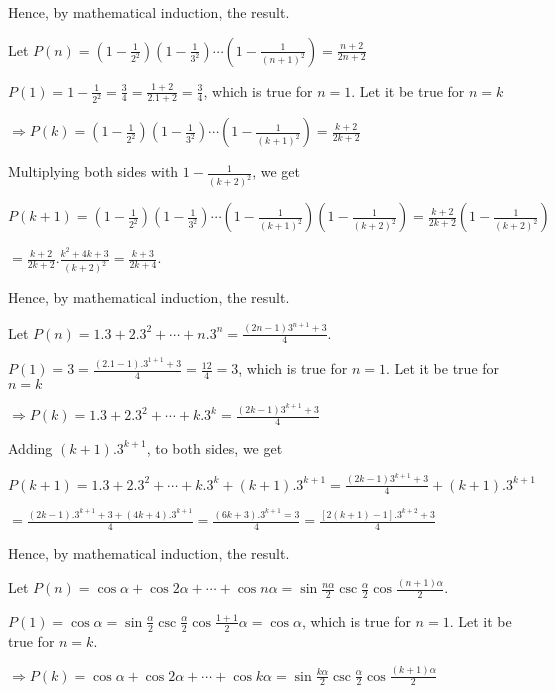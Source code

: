   Hence, by mathematical induction, the result.
\item Let $P(n) = \left(1 - \frac{1}{2^2}\right)\left(1 - \frac{1}{3^2}\right)\cdots\left(1 - \frac{1}{(n +
  1)^2}\right) = \frac{n + 2}{2n + 2}$

  $P(1) = 1 - \frac{1}{2^2} = \frac{3}{4} = \frac{1 + 2}{2.1 + 2} = \frac{3}{4}$, which is true for $n =
  1$. Let it be true for $n = k$

  $\Rightarrow P(k) = \left(1 - \frac{1}{2^2}\right)\left(1 - \frac{1}{3^2}\right)\cdots\left(1 - \frac{1}{(k +
    1)^2}\right) = \frac{k + 2}{2k + 2}$

  Multiplying both sides with $1 - \frac{1}{(k + 2)^2}$, we get

  $P(k + 1) = \left(1 - \frac{1}{2^2}\right)\left(1 - \frac{1}{3^2}\right)\cdots\left(1 - \frac{1}{(k +
    1)^2}\right)\left(1 - \frac{1}{(k + 2)^2}\right) = \frac{k + 2}{2k + 2}\left(1 - \frac{1}{(k +
    2)^2}\right)$

  $= \frac{k + 2}{2k + 2}.\frac{k^2 + 4k + 3}{(k + 2)^2} = \frac{k + 3}{2k + 4}$.

  Hence, by mathematical induction, the result.
\item Let $P(n) = 1.3 + 2.3^2 + \cdots + n.3^n = \frac{(2n - 1)3^{n + 1} + 3}{4}$.

  $P(1) = 3 = \frac{(2.1 - 1).3^{1 + 1} + 3}{4} = \frac{12}{4} = 3$, which is true for $n = 1$. Let it be
  true for $n = k$

  $\Rightarrow P(k) = 1.3 + 2.3^2 + \cdots + k.3^k = \frac{(2k - 1)3^{k + 1} + 3}{4}$

  Adding $(k + 1).3^{k + 1}$, to both sides, we get

  $P(k + 1) = 1.3 + 2.3^2 + \cdots + k.3^k + (k + 1).3^{k + 1} = \frac{(2k - 1)3^{k + 1} + 3}{4} + (k +
  1).3^{k + 1}$

  $= \frac{(2k - 1).3^{k + 1} + 3 + (4k + 4).3^{k + 1}}{4} = \frac{(6k + 3).3^{k + 1} = 3}{4} = \frac{[2(k +
      1) - 1].3^{k + 2} + 3}{4}$

  Hence, by mathematical induction, the result.
\item Let $P(n) = \cos\alpha + \cos2\alpha + \cdots + \cos n\alpha =
  \sin\frac{n\alpha}{2}\csc\frac{\alpha}{2}\cos\frac{(n + 1)\alpha}{2}$.

  $P(1) = \cos\alpha = \sin\frac{\alpha}{2}\csc\frac{\alpha}{2}\cos\frac{1 + 1}{2}\alpha = \cos\alpha$,
  which is true for $n = 1$. Let it be true for $n = k$.

  $\Rightarrow P(k) = \cos\alpha + \cos2\alpha + \cdots + \cos k\alpha =
  \sin\frac{k\alpha}{2}\csc\frac{\alpha}{2}\cos\frac{(k + 1)\alpha}{2}$

